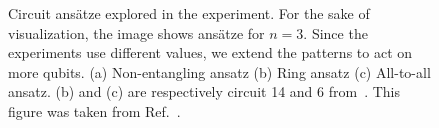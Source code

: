 \documentclass[../main.tex]{subfiles}
\begin{document}
\begin{figure}[h!]
\begin{subfloat}[]
{
        }
    \end{subfloat}
    \caption{
    Circuit ansätze explored in the experiment. For the sake of visualization, the image shows ansätze for $n=3$. Since the experiments use different values, we extend the patterns to act on more qubits. 
    (a) Non-entangling ansatz
    (b) Ring ansatz
    (c) All-to-all ansatz. (b) and (c) are respectively circuit 14 and 6 from~\cite{Sim2019circ}. This figure was taken from Ref.~\cite{tiblias2025an}.}
    \label{fig:ansz}
\end{figure}
\end{document}
